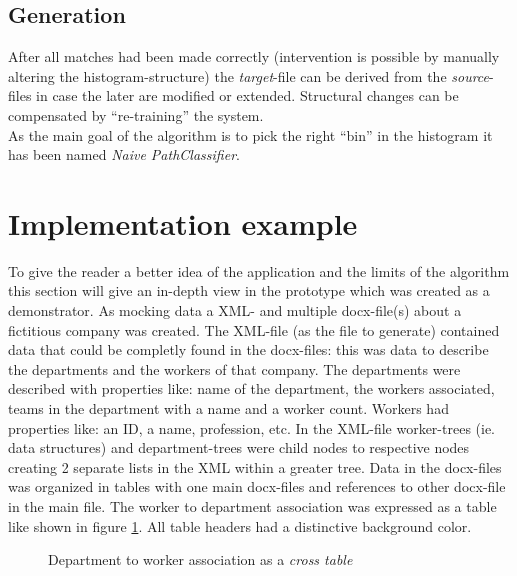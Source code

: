 \documentclass[conference]{IEEEtran}
\begin{document}
\subsection{Generation}
After all matches had been made correctly (intervention is possible by manually altering the
histogram-structure) the \textit{target}-file can be derived from the \textit{source}-files in
case the later are modified or extended. Structural changes can be compensated by ``re-training''
the system.\\As the main goal of the algorithm is to pick the right ``bin'' in the histogram it
has been named \textit{Naive PathClassifier}.

\section{Implementation example}
To give the reader a better idea of the application and the limits of the algorithm this section
will give an in-depth view in the prototype which was created as a demonstrator. As mocking
data a XML- and multiple docx-file(s) about a fictitious company was created. The XML-file (as
the file to generate) contained data that could be completly found in the docx-files: this was
data to describe the departments and the workers of that company. The departments were described
with properties like:\newline
name of the department, the workers associated, teams in the department with a name and a worker
count.\newline
Workers had properties like:
an ID, a name, profession, etc.\newline
In the XML-file worker-trees (ie. data structures) and department-trees were child nodes to
respective nodes creating 2 separate lists in the XML within a greater tree. Data in the
docx-files was organized in tables with one main docx-files and references to other
docx-file in the main file. The worker to  department association was expressed as a table
like shown in figure \ref{cross_table}. All table headers had a distinctive background color.
\begin{figure}[h]
 \centering
 \caption{Department to worker association as a \textit{cross table}}
 \label{cross_table}
\end{figure}
\end{document}
